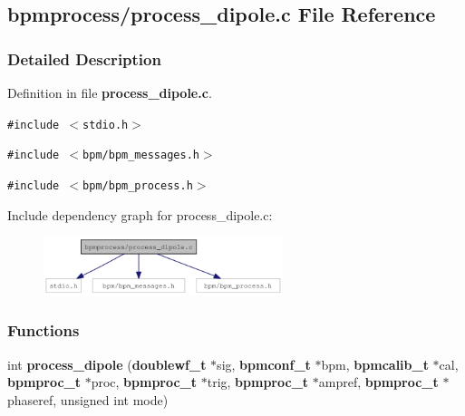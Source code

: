 \subsection{bpmprocess/process\_\-dipole.c File Reference}
\label{process__dipole_8c}


\subsubsection{Detailed Description}


Definition in file {\bf process\_\-dipole.c}.

{\tt \#include $<$stdio.h$>$}\par
{\tt \#include $<$bpm/bpm\_\-messages.h$>$}\par
{\tt \#include $<$bpm/bpm\_\-process.h$>$}\par


Include dependency graph for process\_\-dipole.c:\nopagebreak
\begin{figure}[H]
\begin{center}
\leavevmode
\includegraphics[width=197pt]{process__dipole_8c__incl}
\end{center}
\end{figure}
\subsubsection*{Functions}
\begin{CompactItemize}
\item 
int {\bf process\_\-dipole} ({\bf doublewf\_\-t} $\ast$sig, {\bf bpmconf\_\-t} $\ast$bpm, {\bf bpmcalib\_\-t} $\ast$cal, {\bf bpmproc\_\-t} $\ast$proc, {\bf bpmproc\_\-t} $\ast$trig, {\bf bpmproc\_\-t} $\ast$ampref, {\bf bpmproc\_\-t} $\ast$phaseref, unsigned int mode)
\end{CompactItemize}
